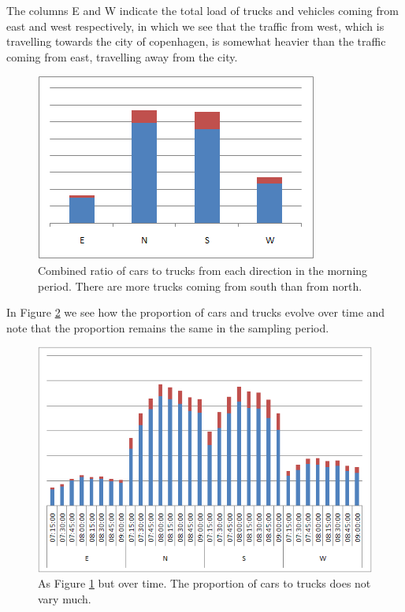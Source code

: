 The columns E and W indicate the total load of trucks and vehicles coming from east and west respectively, in which we see that the traffic from west, which is travelling towards the city of copenhagen, is somewhat heavier than the traffic coming from east, travelling away from the city.

\begin{figure}[!ht]
\centering
\includegraphics[scale=0.5]{cars_vs_truck_vs_direction.png}
\caption{Combined ratio of cars to trucks from each direction in the morning period. There are more trucks coming from south than from north.}
\label{fig:cars2trucks}
\end{figure}

In Figure \ref{fig:cars2trucks_time} we see how the proportion of cars and trucks evolve over time and note that the proportion remains the same in the sampling period.

\begin{figure}[!ht]
\centering
\includegraphics[scale=0.5]{cars_vs_trucks_vs_time_morning.png}
\caption{As Figure \ref{fig:cars2trucks} but over time. The proportion of cars to trucks does not vary much.}
\label{fig:cars2trucks_time}
\end{figure}

